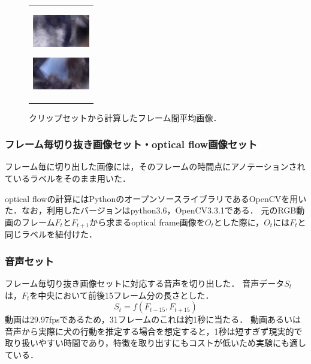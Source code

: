 \begin{figure}[htbp]
\begin{tabular}{c}
\begin{minipage}{0.18\hsize}
\begin{center}
        \end{center}
      \end{minipage}
      \begin{minipage}{0.18\hsize}
        \begin{center}
          \includegraphics[clip, width=2.5cm]{./Figures/resque_mean1.eps}
          \hspace{0.1cm} { }
        \end{center}
      \end{minipage}
      \begin{minipage}{0.18\hsize}
        \begin{center}
          \includegraphics[clip, width=2.5cm]{./Figures/resque_mean5.eps}
          \hspace{0.2cm} { }
        \end{center}
      \end{minipage}
    \end{tabular}
    \caption{クリップセットから計算したフレーム間平均画像．}
    \label{resque_mean}
\end{figure}

\subsubsection{フレーム毎切り抜き画像セット・optical flow画像セット}
フレーム毎に切り出した画像には，そのフレームの時間点にアノテーションされているラベルをそのまま用いた．

optical flowの計算にはPythonのオープンソースライブラリであるOpenCVを用いた．なお，利用したバージョンはpython3.6，OpenCV3.3.1である．
元のRGB動画のフレーム$F_t$と$F_{t+1}$から求まるoptical frame画像を$O_t$とした際に，$O_t$には$F_t$と同じラベルを紐付けた．


\subsubsection{音声セット}
フレーム毎切り抜き画像セットに対応する音声を切り出した．
音声データ$S_t$は，$F_t$を中央において前後15フレーム分の長さとした．
\[S_t = f(F_{t-15}, F_{t+15})\]
動画は29.97fpsであるため，31フレームのこれは約1秒に当たる．
動画あるいは音声から実際に犬の行動を推定する場合を想定すると，1秒は短すぎず現実的で取り扱いやすい時間であり，特徴を取り出すにもコストが低いため実験にも適している．


